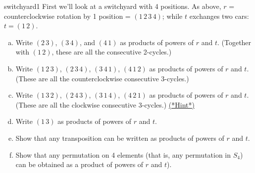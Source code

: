 \begin{exercise}{switchyard1}
First we'll look at a switchyard with 4 positions.  As above, $r$ = counterclockwise rotation by 1 position = $(1 \, 2 \, 3 \, 4)$; while $t$  exchanges two cars: $t = (1 \, 2)$. 
\begin{enumerate}[(a)]
\item
Write $(2 \, 3)$, $(3 \, 4)$, and $(4 \, 1)$ as products of powers of $r$ and $t$. (Together with $(1 \, 2)$, these are all the  consecutive 2-cycles.)
\item
Write $(1 \, 2 \, 3)$, $(2 \, 3 \, 4)$, $(3 \, 4 \, 1)$, $(4 \, 1 \, 2)$ as products of powers of $r$ and $t$. (These are all the counterclockwise consecutive  3-cycles.)
\item
Write $(1 \, 3 \, 2)$, $(2 \, 4 \, 3)$, $(3 \, 1 \, 4)$, $(4 \, 2 \, 1)$ as products of powers of $r$ and $t$. (These are all the clockwise consecutive 3-cycles.)
\hyperref[sec:permute:hints]{(*Hint*)}
\item
Write $(1 \, 3)$ as products of powers of $r$ and $t$.
\item
Show that any transposition can be written as products of powers of $r$ and $t$.
\item
Show that any permutation  on 4 elements (that is, any permutation in $S_4$) can be obtained as a product of powers of $r$ and $t$).
\end{enumerate}
\end{exercise}

